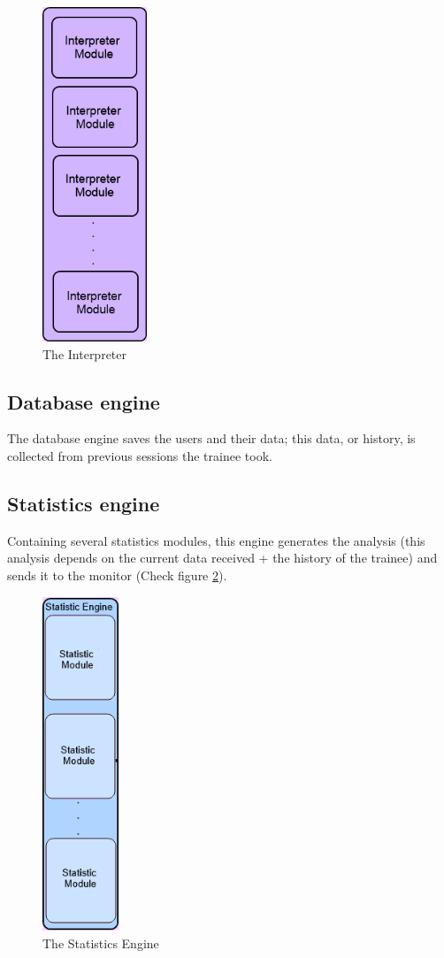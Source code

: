 \begin{figure}[htbp]
\centering 
\includegraphics[height=100mm]{Interpreter.png}
\caption{The Interpreter} 
\label{fig:interpreter} 
\end{figure}

\subsection{Database engine}
The database engine saves the users and their data; this data, or history, is collected from previous sessions the trainee took.

\subsection{Statistics engine}
Containing several statistics modules, this engine generates the analysis (this analysis depends on the current data received + the history of the trainee) and sends it to the monitor (Check figure \ref{fig:statistics}).

\begin{figure}[htbp]
\centering 
\includegraphics[height=100mm]{Statistics.png}
\caption{The Statistics Engine} 
\label{fig:statistics}
\end{figure}

